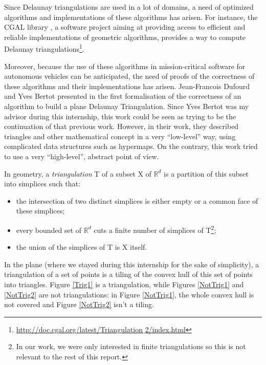 \documentclass[a4paper,10pt]{article}
\begin{document}
Since Delaunay triangulations are used in a lot of domains, a need of optimized algorithms and implementations of these algorithms has arisen. For instance, the CGAL library \cite{cgal}, a software project aiming at providing access to efficient and reliable implementations of geometric algorithms, provides a way to compute Delaunay triangulations\footnote{\href{http://doc.cgal.org/latest/Triangulation_2/index.html}{http://doc.cgal.org/latest/Triangulation$\_$2/index.html}}.

Moreover, because the use of these algorithms in mission-critical software for autonomous vehicles can be anticipated, the need of proofs of the correctness of these algorithms and their implementations has arisen. Jean-Francois Dufourd and Yves Bertot presented in \cite{Bertot} the first formalisation of the correctness of an algorithm to build a plane Delaunay Triangulation. Since Yves Bertot was my advisor during this internship, this work could be seen as trying to be the continuation of that previous work. However, in their work, they described triangles and other mathematical concept in a very ``low-level'' way, using complicated data structures such as hypermaps. On the contrary, this work tried to use a very ``high-level'', abstract point of view.

In geometry, a \emph{triangulation} T of a subset X of $\mathbb{R}^d$ is a partition of this subset into simplices such that: 
\begin{itemize}
\item the intersection of two distinct simplices is either empty or a common face of these simplices;
\item every bounded set of $\mathbb{R}^{d}$ cuts a finite number of simplices of T\footnote{In our work, we were only interested in finite triangulations so this is not relevant to the rest of this report.};
\item the union of the simplices of T is X itself. \label{deftriangulation}
\end{itemize}

In the plane (where we stayed during this internship for the sake of simplicity), a triangulation of a set of points is a tiling of the convex hull of this set of points into triangles. Figure \ref{Trig1} is a triangulation, while Figures \ref{NotTrig1} and \ref{NotTrig2} are not triangulations: in Figure \ref{NotTrig1}, the whole convex hull is not covered and Figure \ref{NotTrig2} isn't a tiling.
\end{document}
